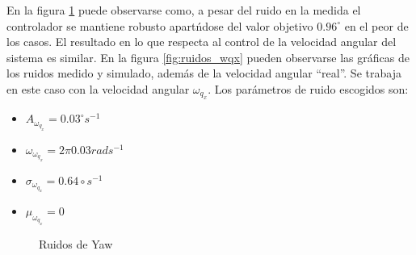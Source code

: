 \documentclass[main]{subfiles}
\begin{document}
En la figura \ref{fig:ruidos_yaw} puede observarse como, a pesar del ruido en la medida el controlador se mantiene robusto apart\'ndose del valor objetivo $0.96^\circ$ en el peor de los casos. El resultado en lo que respecta al control de la velocidad angular del sistema es similar. En la figura \ref{fig:ruidos_wqx} pueden observarse las gr\'aficas de los ruidos medido y simulado, adem\'as de la velocidad angular ``real''. Se trabaja en este caso con la velocidad angular $\omega_{q_x}$. Los par\'ametros de ruido escogidos son:
\begin{itemize}
\item $A_{\omega_{q_x}} = 0.03^\circ s^{-1}$
\item $\omega_{\omega_{q_x}} = 2\pi 0.03 rad s^{-1}$
\item $\sigma_{\omega_{q_x}} = 0.64\circ s^{-1}$
\item $\mu_{\omega_{q_x}} = 0$
\end{itemize}
\begin{figure}
  \centering
  \caption{Ruidos de Yaw}
  \label{fig:ruidos_yaw}
\end{figure}
\end{document}
